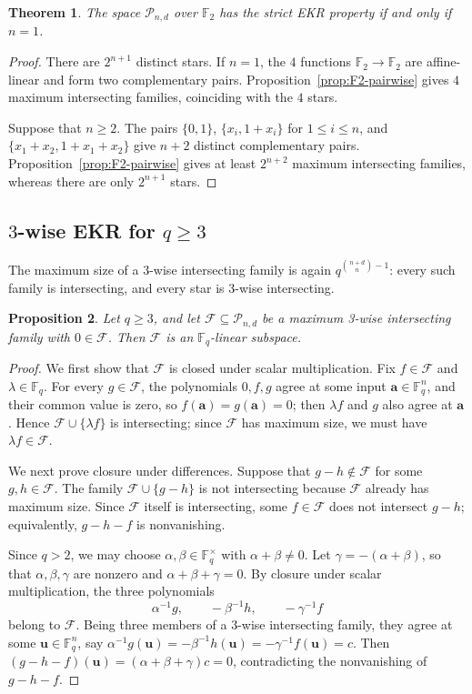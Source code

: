 \documentclass[12pt,reqno]{amsart}
\newtheorem{thm}{Theorem}[section]
\newtheorem{prop}[thm]{Proposition}
\theoremstyle{definition}
\newcommand{\F}{\mathbb{F}}
\newcommand{\cF}{\mathcal F}
\newcommand{\cP}{\mathcal P}
\begin{document}
\begin{thm}
\label{thm:F2-pairwise}
The space $\cP_{n,d}$ over $\F_2$ has the strict EKR
property if and only if $n=1$.
\end{thm}

\begin{proof}
There are $2^{n+1}$ distinct stars. If $n=1$, the $4$ functions
$\F_2\to\F_2$ are affine-linear and form two complementary pairs.
Proposition~\ref{prop:F2-pairwise} gives $4$ maximum intersecting families, coinciding with the $4$ stars.

Suppose that $n\geq2$. The pairs $\{0,1\}$,
$\{x_i,1+x_i\}$ for $1\leq i\leq n$, and
$\{x_1+x_2,1+x_1+x_2\}$ give $n+2$ distinct complementary pairs.
Proposition~\ref{prop:F2-pairwise} gives at least $2^{n+2}$ maximum
intersecting families, whereas there are only $2^{n+1}$ stars.
\end{proof}

\subsection{\texorpdfstring{$3$}{3}-wise EKR for
  \texorpdfstring{$q\geq 3$}{q >= 3}}
\label{subsec:threewise-qge3}

The maximum size of a 3-wise intersecting family is again $q^{\binom{n+d}{n}-1}$: every such family is intersecting, and every star is 3-wise intersecting.

\begin{prop}\label{prop:threewise-linear}
Let $q\geq3$, and let $\cF\subseteq\cP_{n,d}$ be a maximum
3-wise intersecting family with $0\in\cF$. Then $\cF$ is an
$\F_q$-linear subspace.
\end{prop}

\begin{proof}
We first show that $\mathcal{F}$ is closed under scalar multiplication. Fix $f\in\cF$ and $\lambda\in\F_q$. For every $g\in\cF$, the polynomials $0,f,g$ agree at some input $\mathbf{a}\in\F_{q}^{n}$, and their common value is zero, so $f(\mathbf{a})=g(\mathbf{a})=0$; then $\lambda f$ and $g$ also agree at $\mathbf a$. Hence $\cF\cup\{\lambda f\}$ is intersecting; since $\cF$ has maximum size, we must have $\lambda f\in\cF$.

We next prove closure under differences. Suppose that $g-h\notin\cF$ for some $g,h\in\cF$. The family $\cF\cup\{g-h\}$ is not intersecting because $\cF$ already has
maximum size. Since $\cF$ itself is intersecting, some $f\in\cF$
does not intersect $g-h$; equivalently, $g-h-f$ is nonvanishing.

Since $q>2$, we may choose $\alpha,\beta\in \F_q^{\times}$ with $\alpha+\beta\neq0$. Let $\gamma=-(\alpha+\beta)$, so that
$\alpha,\beta,\gamma$ are nonzero and $\alpha+\beta+\gamma=0$. By closure under scalar multiplication, the three polynomials
\[
  \alpha^{-1}g,\qquad -\beta^{-1}h,\qquad -\gamma^{-1}f
\]
belong to $\cF$. Being three members of a 3-wise intersecting family, they agree at some
$\mathbf u\in\F_q^n$, say $\alpha^{-1}g(\mathbf u)=-\beta^{-1}h(\mathbf u)
=-\gamma^{-1}f(\mathbf u)=c$. Then
$(g-h-f)(\mathbf u)=(\alpha+\beta+\gamma)c=0$, contradicting the
nonvanishing of $g-h-f$.
\end{proof}
\end{document}

